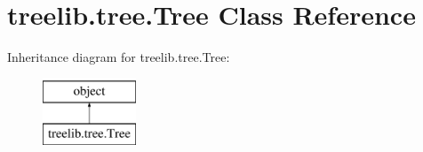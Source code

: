 \hypertarget{classtreelib_1_1tree_1_1Tree}{}\section{treelib.\+tree.\+Tree Class Reference}
\label{classtreelib_1_1tree_1_1Tree}
Inheritance diagram for treelib.\+tree.\+Tree\+:\begin{figure}[H]
\begin{center}
\leavevmode
\includegraphics[height=2.000000cm]{classtreelib_1_1tree_1_1Tree}
\end{center}
\end{figure}
